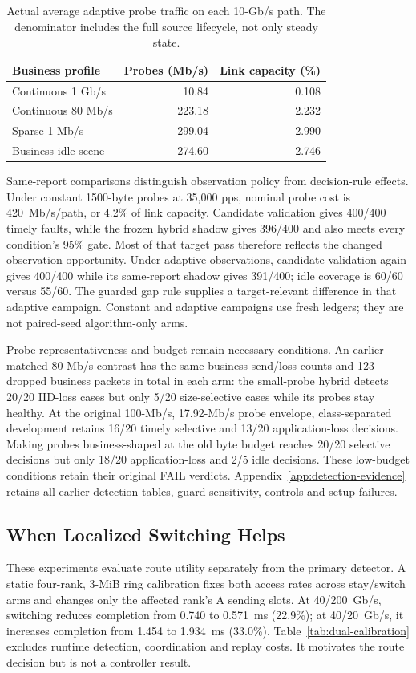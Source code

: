 \documentclass[sigconf]{acmart}
\begin{document}
\begin{table}[t]
\caption{Actual average adaptive probe traffic on each 10-Gb/s path.
The denominator includes the full source lifecycle, not only steady state.}
\label{tab:probe-cost}
\centering\small
\begin{tabular}{@{}lrr@{}}
\toprule
Business profile & Probes (Mb/s) & Link capacity (\%)\\
\midrule
Continuous 1 Gb/s & 10.84 & 0.108\\
Continuous 80 Mb/s & 223.18 & 2.232\\
Sparse 1 Mb/s & 299.04 & 2.990\\
Business idle scene & 274.60 & 2.746\\
\bottomrule
\end{tabular}
\end{table}

Same-report comparisons distinguish observation policy from decision-rule
effects. Under constant 1500-byte probes at 35,000 pps, nominal probe cost is
420~Mb/s/path, or 4.2\% of link capacity. Candidate validation gives 400/400
timely faults, while the frozen hybrid shadow gives 396/400 and also meets
every condition's 95\% gate. Most of that target pass therefore reflects the
changed observation opportunity. Under adaptive observations, candidate
validation again gives 400/400 while its same-report shadow gives 391/400;
idle coverage is 60/60 versus 55/60. The guarded gap rule supplies a
target-relevant difference in that adaptive campaign. Constant and adaptive
campaigns use fresh ledgers; they are not paired-seed algorithm-only arms.

Probe representativeness and budget remain necessary conditions.
An earlier matched 80-Mb/s contrast has the same business send/loss counts
and 123 dropped business packets in total in each arm: the small-probe
hybrid detects 20/20 IID-loss cases but only 5/20 size-selective cases while
its probes stay healthy. At the original 100-Mb/s, 17.92-Mb/s probe envelope,
class-separated development retains 16/20 timely selective and 13/20
application-loss decisions. Making probes business-shaped at the old byte
budget reaches 20/20 selective decisions but only 18/20 application-loss
and 2/5 idle decisions. These low-budget conditions retain their original
FAIL verdicts. Appendix~\ref{app:detection-evidence} retains
all earlier detection tables, guard sensitivity, controls and setup failures.

\subsection{When Localized Switching Helps}
\label{sec:route-results}
These experiments evaluate route utility separately from the primary
detector. A static four-rank, 3-MiB ring calibration fixes both access
rates across stay/switch arms and changes only the affected rank's A
sending slots. At 40/200~Gb/s, switching reduces completion from 0.740
to 0.571~ms (22.9\%); at 40/20~Gb/s, it increases completion from 1.454
to 1.934~ms (33.0\%). Table~\ref{tab:dual-calibration} excludes runtime
detection, coordination and replay costs. It motivates the route decision
but is not a controller result.
\end{document}
